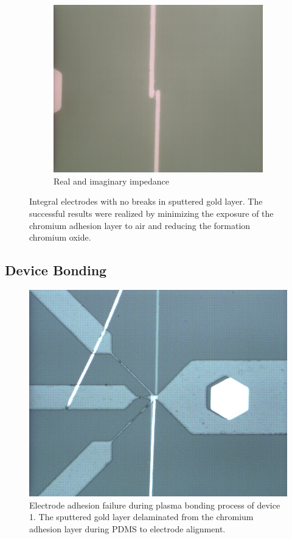 \begin{figure}[h]
\begin{subfigure}[b]{0.45\textwidth}
        \includegraphics[width=\textwidth]{images/goodElectrodeCloseUp.png}
        \caption{Real and imaginary impedance}
    \end{subfigure}
    \caption{Integral electrodes with no breaks in sputtered gold layer. The successful results were realized by minimizing the exposure of the chromium adhesion layer to air and reducing the formation chromium oxide.}
\end{figure}


\FloatBarrier

\subsection{Device Bonding}


\begin{figure}[h]
    \centering
    \includegraphics[width=\textwidth]{images/bad_device.png}
    \caption{Electrode adhesion failure during plasma bonding process of device 1. The sputtered gold layer delaminated from the chromium adhesion layer during PDMS to electrode alignment.}
    \label{fig:bad_device}
\end{figure}


